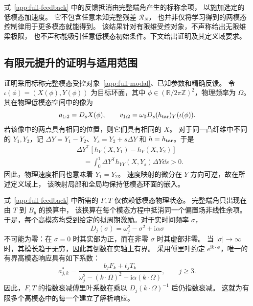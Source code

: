 式~\eqref{app:full-feedback} 中的反馈抵消由完整端角产生的标称余项，
以施加选定的低模态加速度。
它不包含任意未知完整残差 $\mathcal R_N$，
也并非仅将学习得到的两模态控制律用于更多模态就能得到。
该结果针对有限维受控对象，不声称给出无限维梁极限，
也不声称能吸引任意低模态初始条件。下文给出证明及其定义域要求。

\subsection{有限元提升的证明与适用范围}
\label{sm:lift}
证明采用标称完整模态受控对象~\eqref{app:full-modal}、已知参数和精确反馈。
令 $\iota(\phi)=(X(\phi),Y(\phi))$ 为目标环面，其中
$\phi\in(\mathbb R/2\pi\mathbb Z)^2$，物理频率为 $\Omega$。
其在物理低模态空间中的像为
\begin{equation}
 a_{1:2}=D_sX(\phi),\qquad
 v_{1:2}=\omega_0D_s(h_{\rm tar})_Y(\iota(\phi)).
 \label{sm:physical-embedding}
\end{equation}
若该像中的两点具有相同的位置，则它们具有相同的 $X$。
对于同一凸纤维中不同的 $Y_1,Y_2$，记
$\Delta Y=Y_1-Y_2$、$Y_s=Y_2+s\Delta Y$ 和 $h=h_{\rm tar}$。于是
\begin{align}
 &\Delta Y^{\mathsf T}[h_Y(X,Y_1)-h_Y(X,Y_2)]\nonumber\\
 &\quad=\int_0^1
 \Delta Y^{\mathsf T}h_{YY}(X,Y_s)\Delta Y\dd s>0.
 \label{sm:velocity-injectivity}
\end{align}
因此，物理速度相同也意味着 $Y_1=Y_2$。
速度映射的微分在 $Y$ 方向可逆，故在所述定义域上，
该映射局部和全局均保持低模态环面的嵌入。

式~\eqref{app:full-feedback} 中所需的 $F,T$ 仅依赖低模态物理状态。
完整端角只出现在由 $T$ 到 $B_y$ 的换算中，
该换算在每个模态方程中抵消同一个偏置场非线性余项。
于是，每个高模态均受到给定的拟周期激励。对于实时间频率 $\sigma$，
\begin{equation}
 D_j(\sigma)=\omega_j^2-\sigma^2+\mathrm i\alpha\sigma
 \label{sm:stable-resolvent}
\end{equation}
不可能为零：在 $\sigma=0$ 时其实部为正，而在非零 $\sigma$ 时其虚部非零。
当 $|\sigma|\to\infty$ 时，其模长趋于无穷，因此其倒数在实轴上有界。
采用傅里叶约定 $e^{\mathrm i k\cdot\phi}$，唯一的有界高模态响应具有如下系数：
\begin{equation}
 a^*_{j,k}=
 \frac{b_jF_k+t_jT_k}
 {\omega_j^2-(k\cdot\Omega)^2+\mathrm i\alpha(k\cdot\Omega)},
 \qquad j\ge3.
 \label{app:response-coefficients}
\end{equation}
因此，$F,T$ 的指数衰减傅里叶系数在乘以 $D_j(k\cdot\Omega)^{-1}$ 后仍指数衰减。
这就为有限多个高模态中的每一个建立了解析响应。

